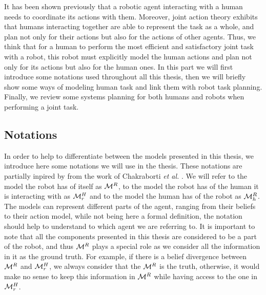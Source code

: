 \documentclass[a4paper,11pt,twoside]{StyleThese}
\begin{document}
It has been shown previously that a robotic agent interacting with a human needs to coordinate its actions with them. Moreover, joint action theory exhibits that humans interacting together are able to represent the task as a whole, and plan not only for their actions but also for the actions of other agents. Thus, we think that for a human to perform the most efficient and satisfactory joint task with a robot, this robot must explicitly model the human actions and plan not only for its actions but also for the human ones. In this part we will first introduce some notations used throughout all this thesis, then we will briefly show some ways of modeling human task and link them with robot task planning. Finally, we review some systems planning for both humans and robots when performing a joint task.

\subsection{Notations}
In order to help to differentiate between the models presented in this thesis, we introduce here some notations we will use in the thesis. These notations are partially inpired by from the work of Chakraborti \textit{et al.} \cite{chakraborti2018human}. We will refer to the model the robot has of itself as $\mathcal{M}^R$, to the model the robot has of the human it is interacting with as $\mathcal{M}^H_r$ and to the model the human has of the robot as $\mathcal{M}^R_h$. The models can represent different parts of the agent, ranging from their beliefs to their action model, while not being here a formal definition, the notation should help to understand to which agent we are referring to. It is important to note that all the components presented in this thesis are considered to be a part of the robot, and thus $\mathcal{M}^R$ plays a special role as we consider all the information in it as the ground truth. For example, if there is a belief divergence between $\mathcal{M}^R$ and $\mathcal{M}^H_r$, we always consider that the $\mathcal{M}^R$ is the truth, otherwise, it would make no sense to keep this information in $\mathcal{M}^R$ while having access to the one in $\mathcal{M}^H_r$.
\end{document}
